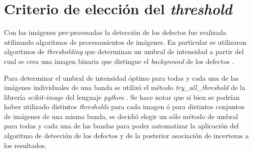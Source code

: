 \singlespacing
\section{Criterio de elección del \textit{threshold} \href{https://github.com/jrr1984/defects_analysis/blob/master/MAIN/try_all_thresholds.py}{\faGithub}}

\hspace{0.5cm}Con las imágenes pre-procesadas la detección de los defectos fue realizada utilizando algoritmos de procesamientos de imágenes. En particular se utilizaron algoritmos de \textit{thresholding} que determinan un umbral de intensidad a partir del cual se crea una imagen binaria que distingue el \textit{background} de los defectos \cite{shapi}.

Para determinar el umbral de intensidad óptimo para todas y cada una de las imágenes individuales de una banda se utilizó el método \textit{try\_all\_threshold} de la librería \textit{scikit-image} del lenguaje \textit{python} \cite{van2014scikit}. Se hace notar que si bien se podrían haber utilizado distintos \textit{thresholds} para cada imagen ó para distintos conjuntos de imágenes de una misma banda, se decidió elegir un sólo método de umbral para todas y cada una de las bandas para poder automatizar la aplicación del algoritmo de detección de los defectos y de la posterior asociación de incertezas a los resultados.

